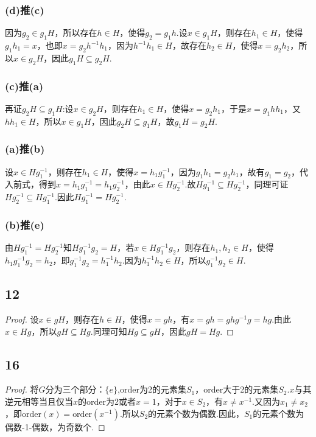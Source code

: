 \documentclass[twocolumn]{article}
\newenvironment{SChinese}{
	\CJKfamily{gbsn}
	\CJKtilde
	\CJKnospace}{}
\begin{document}
\begin{CJK}{UTF8}{}
\begin{SChinese}
					\subsubsection*{(d)\textrm{推}(c)}
						因为$g_2\in g_1H$，所以存在$h\in H$，使得$g_2=g_1h$.设$x\in g_1H$，则存在$h_1\in H$，使得$g_1h_1=x$，也即$x=g_2h^{-1}h_1$，因为$h^{-1}h_1\in H$，故存在$h_2\in H$，使得$x=g_2h_2$，所以$x\in g_2H$，因此$g_1H\subseteq g_2H$.
					\subsubsection*{(c)\textrm{推}(a)}
						再证$g_2H\subseteq g_1H$:设$x\in g_2H$，则存在$h_1\in H$，使得$x=g_2h_1$，于是$x=g_1hh_1$，又$hh_1\in H$，所以$x\in g_1H$，因此$g_2H\subseteq g_1H$，故$g_1H=g_2H$.
					\subsubsection*{(a)\textrm{推}(b)}
						设$x\in Hg_1^{-1}$，则存在$h_1\in H$，使得$x=h_1g_1^{-1}$，因为$g_1h_1=g_2h_1$，故有$g_1=g_2$，代入前式，得到$x=h_1g_1^{-1}=h_1g_2^{-1}$，由此$x\in Hg_2^{-1}$.故$Hg_1^{-1}\subseteq Hg_2^{-1}$，同理可证$Hg_2^{-1}\subseteq Hg_1^{-1}$.因此$Hg_1^{-1}=Hg_2^{-1}$.
					\subsubsection*{(b)\textrm{推}(e)}
						由$Hg_1^{-1}=Hg_2^{-1}$知$Hg_1^{-1}g_2=H$，若$x\in Hg_1^{-1}g_2$，则存在$h_1,h_2\in H$，使得$h_1g_1^{-1}g_2=h_2$，即$g_1^{-1}g_2=h_1^{-1}h_2$.因为$h_1^{-1}h_2\in H$，所以$g_1^{-1}g_2\in H$.
				\subsection*{12}
					\begin{proof}
						设$x\in gH$，则存在$h\in H$，使得$x=gh$，有$x=gh=ghg^{-1}g=hg$.由此$x\in Hg$，所以$gH\subseteq Hg$.同理可知$Hg\subseteq gH$，因此$gH=Hg$. 
					\end{proof}
				\subsection*{16}
					\begin{proof}
						将$G$分为三个部分：$\{e\}$,order为2的元素集$S_1$，order大于2的元素集$S_2$.$x$与其逆元相等当且仅当$x$的order为2或者$x=1$，对于$x\in S_2$，有$x\neq x^{-1}$.又因为$x_1\neq x_2$，即$\textrm{order}(x)=\textrm{order}(x^{-1})$.所以$S_2$的元素个数为偶数.因此，$S_1$的元素个数为偶数-1-偶数，为奇数个.
					\end{proof}

\end{SChinese}
\end{CJK}
\end{document}
